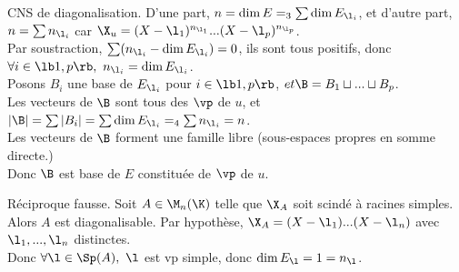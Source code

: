\documentclass[11pt]{article}
\begin{document}
\begin{prop}{CNS de diagonalisation.}{}
    D'une part, $n=\dim E =_3 \sum \dim E_{\l_i}$, et d'autre part, $n=\sum n_{\l_i}$ car $\X_u=(X-\l_1)^{n_{\l_1}}...(X-\l_p)^{n_{\l_p}}$.\\
    Par soustraction, $\sum(n_{\l_i}-\dim E_{\l_i})=0$, ils sont tous positifs, donc $\forall i \in \lb1,p\rb, ~ n_{\l_i}=\dim E_{\l_i}$.\\
     Posons $B_i$ une base de $E_{\l_i}$ pour $i\in\lb1,p\rb$, $et \B=B_1\sqcup ... \sqcup B_p$.\\
    Les vecteurs de $\B$ sont tous des $\vp$ de $u$, et $|\B|=\sum|B_i|=\sum\dim E_{\l_i}=_4\sum n_{\l_i}= n$.\\
    Les vecteurs de $\B$ forment une famille libre (sous-espaces propres en somme directe.)\\
    Donc $\B$ est base de $E$ constituée de $\vp$ de $u$.
\end{prop}

\vspace*{-0.7cm}

\begin{corr}{Réciproque fausse.}{}
    Soit $A\in\M_n(\K)$ telle que $\X_A$ soit scindé à racines simples. Alors $A$ est diagonalisable.
    \tcblower
    Par hypothèse, $\X_A=(X-\l_1)...(X-\l_n)$ avec $\l_1,...,\l_n$ distinctes.\\
    Donc $\forall \l\in\Sp(A), ~ \l$ est vp simple, donc $\dim E_{\l}=1=n_\l$.
\end{corr}

\pagebreak
\end{document}

